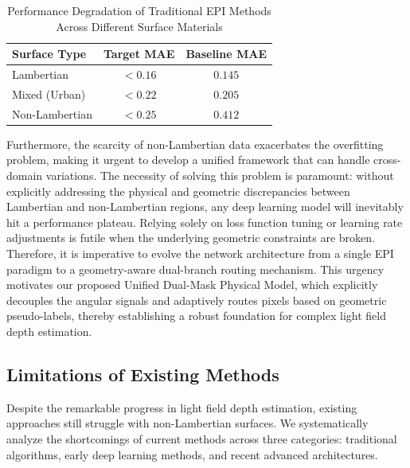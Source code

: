 \begin{table}[!t]
\centering
\caption{Performance Degradation of Traditional EPI Methods Across Different Surface Materials}
\label{tab:mae_degradation}
\begin{tabular}{lcc}
\toprule
\textbf{Surface Type} & \textbf{Target MAE} & \textbf{Baseline MAE} \\
\midrule
Lambertian & $< 0.16$ & $0.145$ \\
Mixed (Urban) & $< 0.22$ & $0.205$ \\
Non-Lambertian & $< 0.25$ & $0.412$ \\
\bottomrule
\end{tabular}
\end{table}

Furthermore, the scarcity of non-Lambertian data exacerbates the overfitting problem, making it urgent to develop a unified framework that can handle cross-domain variations. The necessity of solving this problem is paramount: without explicitly addressing the physical and geometric discrepancies between Lambertian and non-Lambertian regions, any deep learning model will inevitably hit a performance plateau. Relying solely on loss function tuning or learning rate adjustments is futile when the underlying geometric constraints are broken. Therefore, it is imperative to evolve the network architecture from a single EPI paradigm to a geometry-aware dual-branch routing mechanism. This urgency motivates our proposed Unified Dual-Mask Physical Model, which explicitly decouples the angular signals and adaptively routes pixels based on geometric pseudo-labels, thereby establishing a robust foundation for complex light field depth estimation.

\subsection{Limitations of Existing Methods}

Despite the remarkable progress in light field depth estimation, existing approaches still struggle with non-Lambertian surfaces. We systematically analyze the shortcomings of current methods across three categories: traditional algorithms, early deep learning methods, and recent advanced architectures.

